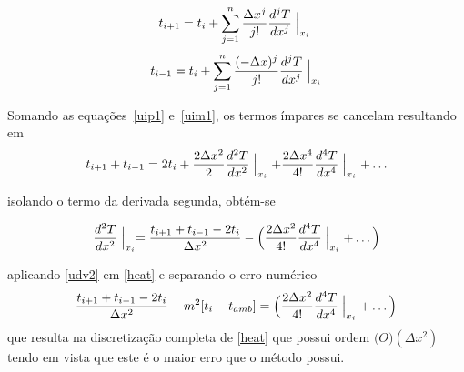 \documentclass[a4paper, 12pt]{article}
\begin{document}
\begin{equation}
  \label{uip1}
  t_{i+1} = t_i+\sum_{j=1}^n \frac{\Delta x^j}{j!}\frac{d^jT}{dx^j}\Bigm\lvert_{x_i} \\ 
\end{equation}
\begin{equation}
  \label{uim1}
  t_{i-1} = t_i+\sum_{j=1}^n \frac{(-\Delta x)^j}{j!}\frac{d^jT}{dx^j}\Bigm\lvert_{x_i}
\end{equation}

Somando as equações~\ref{uip1} e~\ref{uim1}, os termos ímpares se cancelam resultando em 
\begin{equation}
  \label{uims}
  t_{i+1}+t_{i-1}= 2t_i + \frac{2\Delta x^2}{2}\frac{d^2T}{dx^2}\Bigm\lvert_{x_i} + \frac{2\Delta x^4}{4!}\frac{d^4T}{dx^4}\Bigm\lvert_{x_i} + \ldots
\end{equation}

isolando o termo da derivada segunda, obtém-se

\begin{equation}
  \label{udv2}
  \frac{d^2T}{dx^2}\Bigm\lvert_{x_i}=\frac{t_{i+1}+t_{i-1} - 2t_i}{\Delta x^2} - \Big( \frac{2\Delta x^2}{4!}\frac{d^4T}{dx^4}\Bigm\lvert_{x_i} + \ldots \Big)  
\end{equation}

aplicando \ref{udv2} em \ref{heat} e separando o erro numérico 
\begin{equation}
  \label{udv2}
  \frac{t_{i+1}+t_{i-1} - 2t_i}{\Delta x^2} - m^2 [t_i - t_{amb}] = \Big( \frac{2\Delta x^2}{4!}\frac{d^4T}{dx^4}\Bigm\lvert_{x_i} + \ldots \Big) 
\end{equation}
que resulta na discretização completa de \ref{heat} que possui ordem $\mathcal(O)(\Delta x^2)$ tendo em vista que este é o maior erro que o método possui.
% 
% 
% 
% 
\end{document}
